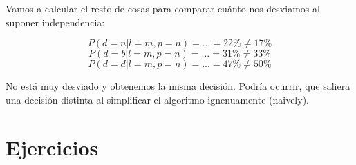 \documentclass{apuntes}
\begin{document}
Vamos a calcular el resto de cosas para comparar cuánto nos desviamos al suponer independencia:

\[ P(d=n | l=m,p=n) = ... = 22\% ≠ 17\% \]
\[ P(d=b | l=m,p=n) = ... = 31\% ≠ 33\% \]
\[ P(d=d | l=m,p=n) = ... = 47\% ≠ 50\% \]

No está muy desviado y obtenemos la misma decisión. Podría ocurrir, que saliera una decisión distinta al simplificar el algoritmo ignenuamente (naively).


\appendix

\chapter{Ejercicios}

\printindex
\end{document}
